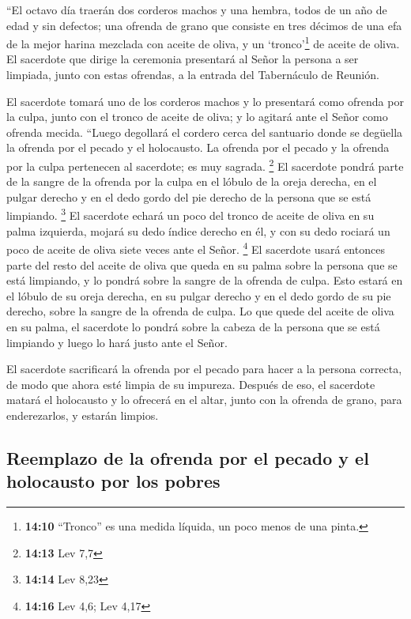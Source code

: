  ``El octavo día traerán dos corderos machos y una
hembra, todos de un año de edad y sin defectos; una ofrenda de grano que
consiste en tres décimos de una efa de la mejor harina mezclada con
aceite de oliva, y un `tronco'\footnote{\textbf{14:10} ``Tronco'' es una
  medida líquida, un poco menos de una pinta.} de aceite de oliva.
 El sacerdote que dirige la ceremonia presentará al Señor
la persona a ser limpiada, junto con estas ofrendas, a la entrada del
Tabernáculo de Reunión.

 El sacerdote tomará uno de los corderos machos y lo
presentará como ofrenda por la culpa, junto con el tronco de aceite de
oliva; y lo agitará ante el Señor como ofrenda mecida. 
``Luego degollará el cordero cerca del santuario donde se degüella la
ofrenda por el pecado y el holocausto. La ofrenda por el pecado y la
ofrenda por la culpa pertenecen al sacerdote; es muy sagrada.
\footnote{\textbf{14:13} Lev 7,7}  El sacerdote pondrá
parte de la sangre de la ofrenda por la culpa en el lóbulo de la oreja
derecha, en el pulgar derecho y en el dedo gordo del pie derecho de la
persona que se está limpiando. \footnote{\textbf{14:14} Lev 8,23}
 El sacerdote echará un poco del tronco de aceite de
oliva en su palma izquierda,  mojará su dedo índice
derecho en él, y con su dedo rociará un poco de aceite de oliva siete
veces ante el Señor. \footnote{\textbf{14:16} Lev 4,6; Lev 4,17}
 El sacerdote usará entonces parte del resto del aceite
de oliva que queda en su palma sobre la persona que se está limpiando, y
lo pondrá sobre la sangre de la ofrenda de culpa. Esto estará en el
lóbulo de su oreja derecha, en su pulgar derecho y en el dedo gordo de
su pie derecho, sobre la sangre de la ofrenda de culpa. 
Lo que quede del aceite de oliva en su palma, el sacerdote lo pondrá
sobre la cabeza de la persona que se está limpiando y luego lo hará
justo ante el Señor.

 El sacerdote sacrificará la ofrenda por el pecado para
hacer a la persona correcta, de modo que ahora esté limpia de su
impureza. Después de eso, el sacerdote matará el holocausto
 y lo ofrecerá en el altar, junto con la ofrenda de
grano, para enderezarlos, y estarán limpios.

\hypertarget{reemplazo-de-la-ofrenda-por-el-pecado-y-el-holocausto-por-los-pobres}{%
\subsection{Reemplazo de la ofrenda por el pecado y el holocausto por
los
pobres}\label{reemplazo-de-la-ofrenda-por-el-pecado-y-el-holocausto-por-los-pobres}}

